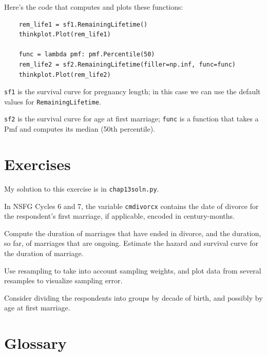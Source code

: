 \documentclass[12pt]{book}
\begin{document}
Here's the code that computes and plots these functions:

\begin{verbatim}
    rem_life1 = sf1.RemainingLifetime()
    thinkplot.Plot(rem_life1)

    func = lambda pmf: pmf.Percentile(50)
    rem_life2 = sf2.RemainingLifetime(filler=np.inf, func=func)
    thinkplot.Plot(rem_life2)
\end{verbatim}

{\tt sf1} is the survival curve for pregnancy length;
in this case we can use the default values for {\tt RemainingLifetime}.

{\tt sf2} is the survival curve for age at first marriage;
{\tt func} is a function that takes a Pmf and computes its
median (50th percentile).


\section{Exercises}

My solution to this exercise is in \verb"chap13soln.py".

\begin{exercise}
In NSFG Cycles 6 and 7, the variable {\tt cmdivorcx} contains the
date of divorce for the respondent's first marriage, if applicable,
encoded in century-months.

Compute the duration of marriages that have ended in divorce, and
the duration, so far, of marriages that are ongoing.  Estimate the
hazard and survival curve for the duration of marriage.

Use resampling to take into account sampling weights, and plot
data from several resamples to visualize sampling error.

Consider dividing the respondents into groups by decade of birth,
and possibly by age at first marriage.

\end{exercise}


\section{Glossary}
\end{document}
